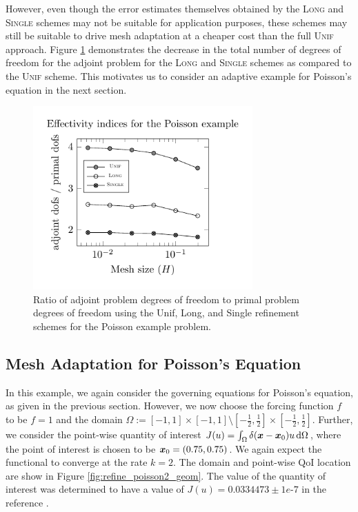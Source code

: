 However, even though the error estimates themselves obtained by
the \textsc{Long} and \textsc{Single} schemes may not be suitable
for application purposes, these schemes may still be suitable to
drive mesh adaptation at a cheaper cost than the full \textsc{Unif}
approach. Figure \ref{fig:refine_poisson_dofs}
demonstrates the decrease in the total number of degrees of
freedom for the adjoint problem for the \textsc{Long} and \textsc{Single}
schemes as compared to the \textsc{Unif} scheme. This motivates
us to consider an adaptive example for Poisson's equation in the
next section.

%
\begin{figure}[ht!]
\centering
\includegraphics[width=0.75\textwidth]{img/refine_poisson_dofs}
\caption{Ratio of adjoint problem degrees of freedom to primal
problem degrees of freedom using the Unif,
Long, and Single refinement schemes
for the Poisson example problem.}
\label{fig:refine_poisson_dofs}
\end{figure}

\subsection{Mesh Adaptation for Poisson's Equation}

In this example, we again consider the governing equations for Poisson's
equation, as given in the previous section. However, we now choose the
forcing function $f$ to be $f=1$ and the domain
$\Omega := [-1,1] \times [-1,1] \setminus
[-\frac12, \frac12] \times [-\frac12, \frac12]$. Further, we consider
the point-wise quantity of interest
$J(u) = \int_{\Omega} \delta(\boldsymbol{x} - \boldsymbol{x}_0) u \, \text{d} \Omega$,
where the point of interest is chosen to be
$\boldsymbol{x}_0 = (0.75, 0.75)$. We again expect the functional to converge
at the rate $k = 2$. The domain and point-wise QoI location are show
in Figure \ref{fig:refine_poisson2_geom}. The value of the quantity
of interest was determined to have a value of $J(u) = 0.0334473
\pm 1e\mbox{-}7$ in the reference \cite{dealiistep14}.

